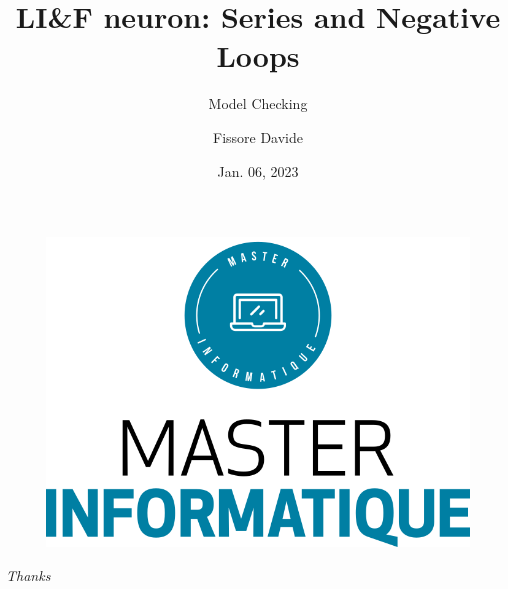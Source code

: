 \documentclass[usenames,dvipsnames]{beamer}
\author{Fissore Davide}
\title{LI\&F neuron: Series and Negative Loops}
\subtitle{Model Checking}
\institute{Université Côte d'Azur}
\date{Jan. 06, 2023}
\begin{document}
\begin{frame}
    \titlepage
    \begin{figure}[htpb]
        \begin{center}
            \includegraphics[width=0.2\linewidth]{pic/logo_master.png}
        \end{center}
    \end{figure}
\end{frame}

\begin{frame}
    \tableofcontents[hideallsubsections]
\end{frame}

\begingroup
\AtBeginSection[] {}




\endgroup

\begin{frame}{}
    \centering \Large
    \emph{Thanks}
\end{frame}
\end{document}
